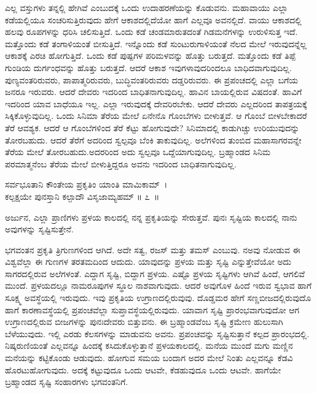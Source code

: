 ಎಲ್ಲ ವಸ್ತುಗಳು ತನ್ನಲ್ಲಿ ಹೇಗಿವೆ ಎಂಬುದಕ್ಕೆ ಒಂದು ಉದಾಹರಣೆಯನ್ನು ಕೊಡುವನು. ಮಹಾವಾಯು ಎಲ್ಲಾ ಕಡೆಯಲ್ಲಿಯೂ ಸಂಚರಿಸುತ್ತಿರುವುದು ಹೇಗೆ ಆಕಾಶದಲ್ಲಿದೆಯೋ ಹಾಗೆ ಎಲ್ಲವೂ ಅವನಲ್ಲಿದೆ. ವಾಯು ಆಕಾಶದಲ್ಲಿ ಹಲವು ರೂಪಗಳನ್ನು ಧರಿಸಿ ಚಲಿಸುತ್ತಿದೆ. ಒಂದು ಕಡೆ ಚಂಡಮಾರುತದಂತೆ ಗಿಡಮನೆಗಳನ್ನು ಉರುಳಿಸುತ್ತ ಇದೆ. ಮತ್ತೊಂದು ಕಡೆ ತಂಗಾಳಿಯಂತೆ ಬೀಸುತ್ತಿದೆ. ಇನ್ನೊಂದು ಕಡೆ ಸುಂಟುರುಗಾಳಿಯಂತೆ ನೆಲದ ಮೇಲೆ ಇರುವುದನ್ನೆಲ್ಲ ಆಕಾಶಕ್ಕೆ ಎರಚಿ ಹೋಗುತ್ತಿದೆ. ಒಂದು ಕಡೆ ಪುಷ್ಪಗಳ ಪರಿಮಳವನ್ನು ಹೊತ್ತು ಬರುತ್ತದೆ. ಮತ್ತೊಂದು ಕಡೆ ತಿಪ್ಪೆ ಗುಂಡಿಯ ದುರ್ಗಂಧವನ್ನು ಹೊತ್ತು ಬರುತ್ತದೆ. ಆದರೆ ಆಕಾಶ ಇವುಗಳಾವುದರಿಂದಲೂ ಬಾಧಿದವಾಗುವುದಿಲ್ಲ. ಪುಣ್ಯವಂತರಿರುವರು, ಪಾಪಾತ್ಮರಿರುವರು, ಬುದ್ಧಿವಂತರಿರುವರು ದಡ್ಡರಿರುವರು. ಈ ಪ್ರಪಂಚದಲ್ಲಿ ಎಲ್ಲಾ ಬಗೆಯ ಜನರೂ ಇರುವರು. ಆದರೆ ದೇವರು ಇದರಿಂದ ಬಾಧಿತನಾಗುವುದಿಲ್ಲ. ಹಾವಿನ ಬಾಯಲ್ಲಿರುವ ವಿಷದಂತೆ. ಹಾವಿಗೆ ಇದರಿಂದ ಯಾವ ಬಾಧೆಯೂ ಇಲ್ಲ. ಎಲ್ಲಾ ಇರುವುದಕ್ಕೆ ದೇವರಿರಬೇಕು. ಆದರೆ ದೇವರು ಎಲ್ಲದರಿಂದ ತಾಪತ್ರಯಕ್ಕೆ ಸಿಕ್ಕಿಕೊಳ್ಳುವುದಿಲ್ಲ. ಒಂದು ಸಿನಿಮಾ ತೆರೆಯ ಮೇಲೆ ಏನೇನೊ ಗೊಂಬೆಗಳು ಬೀಳುತ್ತವೆ. ಆ ಗೊಂಬೆ ಬೀಳಬೇಕಾದರೆ ತೆರೆ ಆವಶ್ಯಕ. ಆದರೆ ಆ ಗೊಂಬೆಗಳಿಂದ ತೆರೆ ಕೆಟ್ಟು ಹೋಗುವುದೇ? ಸಿನಿಮಾದಲ್ಲಿ ಕಾಡುಗಿಚ್ಚು ಉರಿಯುವುದನ್ನು ತೋರಬಹುದು. ಆದರೆ ತೆರೆಗೆ ಅದರಿಂದ ಸ್ವಲ್ಪವೂ ಬೆಂಕಿ ತಾಕುವುದಿಲ್ಲ. ಅಲೆಗಳಿಂದ ತುಂಬಿದ ಮಹಾಸಾಗರವನ್ನೇ ತೆರೆಯ ಮೇಲೆ ತೋರಬಹುದು.ಅದರರಿಂದ ಅದು ಸ್ವಲ್ಪವೂ ಒದ್ದೆಯಾಗುವುದಿಲ್ಲ. ಬ್ರಹ್ಮಾಂಡದ ಸಿನಿಮ ಪರಮಾತ್ಮನೆಂಬ ತೆರೆಯ ಮೇಲೆ ಬೀಳುತ್ತಿದ್ದರೂ ಅವನು ಇದರಿಂದ ಬಾಧಿತನಾಗುವುದಿಲ್ಲ.

\begin{shloka}
ಸರ್ವಭೂತಾನಿ ಕೌಂತೇಯ ಪ್ರಕೃತಿಂ ಯಾಂತಿ ಮಾಮಿಕಾಮ್~।\\ಕಲ್ಪಕ್ಷಯೇ ಪುನಸ್ತಾನಿ ಕಲ್ಪಾದೌ ವಿಸೃಜಾಮ್ಯಹಮ್ \hfill॥ ೭~॥
\end{shloka}

\begin{artha}
ಅರ್ಜುನ, ಎಲ್ಲಾ ಪ್ರಾಣಿಗಳು ಪ್ರಳಯ ಕಾಲದಲ್ಲಿ ನನ್ನ ಪ್ರಕೃತಿಯನ್ನು ಸೇರುತ್ತವೆ. ಪುನಃ ಸೃಷ್ಟಿಯ ಕಾಲದಲ್ಲಿ ನಾನು ಅವುಗಳನ್ನು ಸೃಷ್ಟಿಸುತ್ತೇನೆ.
\end{artha}

ಭಗವಂತನ ಪ್ರಕೃತಿ ತ್ರಿಗುಣಗಳಿಂದ ಆಗಿದೆ. ಅದೇ ಸತ್ವ, ರಜಸ್ ಮತ್ತು ತಮಸ್ ಎಂಬುವು. ನಅವು ನೋಡುವ ಈ ವಿಶ್ವವೆಲ್ಲಾ ಈ ಗುಣಗಳ ತರತಮದಿಂದ ಆದುದು. ಯಾವುದನ್ನು ಪ್ರಳಯ ಮತ್ತು ಸೃಷ್ಟಿ ಎನ್ನುತ್ತೇವೆಯೋ ಅದು ಸಾಗರದಲ್ಲಿರುವ ಅಲೆಗಳಂತೆ. ಎದ್ದಾಗ ಸೃಷ್ಟಿ, ಬಿದ್ದಾಗ ಪ್ರಳಯ. ಎಷ್ಟೊ ಪ್ರಳಯ ಸೃಷ್ಟಿಗಳು ಆಗಿವೆ ಹಿಂದೆ, ಆಗಲಿವೆ ಮುಂದೆ. ಪ್ರಳಯದಲ್ಲೂ ನಾಮರೂಪುಗಳ ಸ್ಥೂಲ ನಾಶವಾಗುವುದು. ಆದರೆ ಅವುಗೊಳ ಹಿಂದೆ ಇರುವ ಸ್ವಭಾವ ಹಾಗೆ ಸೂಕ್ಷ್ಮ ಅವಸ್ಥೆಯಲ್ಲಿ ಇರುವುದು. ಇವು ಪ್ರಕೃತಿಯ ಉಗ್ರಾಣದಲ್ಲಿರುವುವು. ದೊಡ್ಡಮರ ಹೇಗೆ ಸಣ್ಣಬೀಜದಲ್ಲಿರುವುದೊ ಹಾಗೆ ಕಾರಣಾವಸ್ಥೆಯಲ್ಲಿ ಪ್ರಪಂಚವೆಲ್ಲಾ ಸುಪ್ತಾವಸ್ಥೆಯಲ್ಲಿರುವುದು. ಯಾವಾಗ ಸೃಷ್ಟಿ ಪ್ರಾರಂಭವಾಗುವುದೋ ಆಗ ಉಗ್ರಾಣದಲ್ಲಿರುವ ಬೀಜಗಳನ್ನು ಪುನಃ\break ದೇವರು ಬಿತ್ತುವನು. ಈ ಬ್ರಹ್ಮಾಂಡವೆಂಬ ಸೃಷ್ಟಿ ಕ್ರಮೇಣ ಹುಲುಸಾಗಿ ಬೆಳೆಯುವುದು. ಇಲ್ಲಿ ಎರಡು ಕೆಲಸಗಳನ್ನು ಮಾಡುವನು ಅವನು. ಪ್ರಪಂಚವನ್ನು ಸೃಷ್ಟಿಸುತ್ತಾನೆ ಕಲ್ಪದ ಪ್ರಾರಂಭದಲ್ಲಿ. ನಿಷ್ಕರುಣಿಯಂತೆ ಎಲ್ಲವನ್ನೂ ಹಿಂದಕ್ಕೆ ಕಸಿದುಕೊಳ್ಳುತ್ತಾನೆ ಪ್ರಳಯಕಾಲದಲ್ಲಿ. ಮನೆಯ ಮುಂದೆ ಮಗು ಮಣ್ಣಿನ ಮನೆಯನ್ನು ಕಟ್ಟಿಕೊಂಡು ಆಡುವುದು. ಹೋಗುವ ಸಮಯ ಬಂದಾಗ ಅದರ ಮೇಲೆ ನಿಂತು ಎಲ್ಲವನ್ನೂ ಕೆಡವಿ ಹೊರಟುಹೋಗುವುದು. ಅದಕ್ಕೆ ಕಟ್ಟುವುದೂ ಒಂದು ಆಟವೇ, ಕೆಡಹುವುದೂ ಒಂದು ಆಟವೇ. ಹಾಗೆಯೇ ಬ್ರಹ್ಮಾಂಡದ ಸೃಷ್ಟಿ ಸಂಹಾರಗಳು ಭಗವಂತನಿಗೆ.

